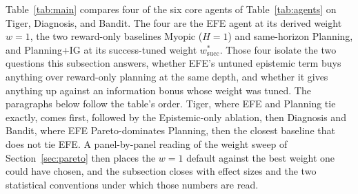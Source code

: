 Table~\ref{tab:main} compares four of the six core agents of Table~\ref{tab:agents} on Tiger, Diagnosis, and Bandit. The four are the EFE agent at its derived weight $w{=}1$, the two reward-only baselines Myopic ($H{=}1$) and same-horizon Planning, and Planning+IG at its success-tuned weight $w^*_{\mathrm{succ}}$. Those four isolate the two questions this subsection answers, whether EFE's untuned epistemic term buys anything over reward-only planning at the same depth, and whether it gives anything up against an information bonus whose weight was tuned. The paragraphs below follow the table's order. Tiger, where EFE and Planning tie exactly, comes first, followed by the Epistemic-only ablation, then Diagnosis and Bandit, where EFE Pareto-dominates Planning, then the closest baseline that does not tie EFE. A panel-by-panel reading of the weight sweep of Section~\ref{sec:pareto} then places the $w{=}1$ default against the best weight one could have chosen, and the subsection closes with effect sizes and the two statistical conventions under which those numbers are read.

